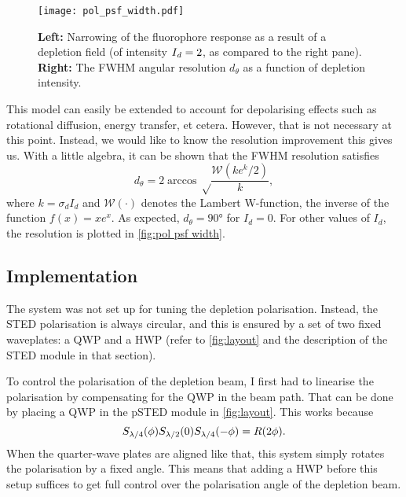 \begin{figure}
	\centering
	\texttt{[image: pol\_psf\_width.pdf]}
	\caption{
		\textbf{Left:} Narrowing of the fluorophore response as a result of a depletion field (of intensity $ I_{\mathit{d}}=2 $, as compared to the right pane). \textbf{Right:} The FWHM angular resolution $ d_\theta $ as a function of depletion intensity.
	}
	\label{fig:pol psf width}
\end{figure}

This model can easily be extended to account for depolarising effects such as rotational diffusion, energy transfer, et cetera. However, that is not necessary at this point. Instead, we would like to know the resolution improvement this gives us. With a little algebra, it can be shown that the FWHM resolution satisfies
\begin{equation}
	d_\theta = 2\arccos\sqrt\frac{\mathcal{W}(k e^{k}/2)}{k},
\end{equation}
where $ k = \sigma_dI_d $ and $ \mathcal{W}(\cdot) $ denotes the Lambert W-function, the inverse of the function $ f(x) = xe^x $. As expected, $ d_\theta=\ang{90} $ for $ I_d=0 $. For other values of $ I_d $, the resolution is plotted in \autoref{fig:pol psf width}.


\subsection{Implementation}
\label{sec: psted implementation}

The system was not set up for tuning the depletion polarisation. Instead, the STED polarisation is always circular, and this is ensured by a set of two fixed waveplates: a QWP and a HWP (refer to \autoref{fig:layout} and the description of the STED module in that section). 

To control the polarisation of the depletion beam, I first had to linearise the polarisation by compensating for the QWP in the beam path. That can be done by placing a QWP in the pSTED module in \autoref{fig:layout}. This works because 
\begin{equation}
	S_{\lambda/4}(\phi)S_{\lambda/2}(0)S_{\lambda/4}(-\phi) = R(2\phi).
\end{equation}
When the quarter-wave plates are aligned like that, this system simply rotates the polarisation by a fixed angle. This means that adding a HWP before this setup suffices to get full control over the polarisation angle of the depletion beam.

